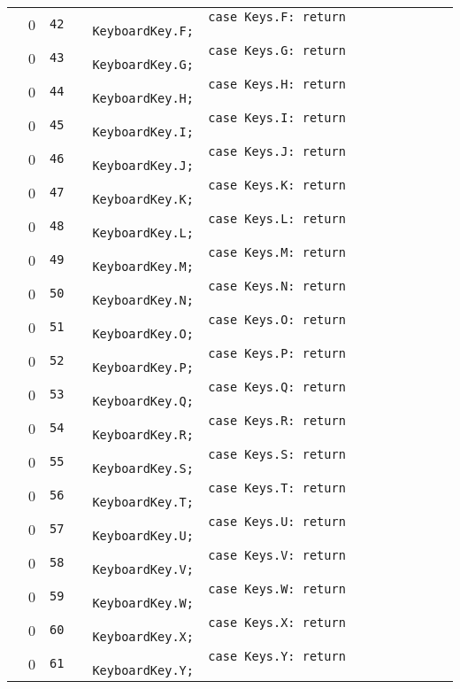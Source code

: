 \documentclass[a4paper,landscape,10pt]{article}
\begin{document}
\begin{longtable}[l]{lrrll}
\cellcolor{red} & 0 & \verb~42~ & & \verb~                case Keys.F: return KeyboardKey.F;~\\
\cellcolor{red} & 0 & \verb~43~ & & \verb~                case Keys.G: return KeyboardKey.G;~\\
\cellcolor{red} & 0 & \verb~44~ & & \verb~                case Keys.H: return KeyboardKey.H;~\\
\cellcolor{red} & 0 & \verb~45~ & & \verb~                case Keys.I: return KeyboardKey.I;~\\
\cellcolor{red} & 0 & \verb~46~ & & \verb~                case Keys.J: return KeyboardKey.J;~\\
\cellcolor{red} & 0 & \verb~47~ & & \verb~                case Keys.K: return KeyboardKey.K;~\\
\cellcolor{red} & 0 & \verb~48~ & & \verb~                case Keys.L: return KeyboardKey.L;~\\
\cellcolor{red} & 0 & \verb~49~ & & \verb~                case Keys.M: return KeyboardKey.M;~\\
\cellcolor{red} & 0 & \verb~50~ & & \verb~                case Keys.N: return KeyboardKey.N;~\\
\cellcolor{red} & 0 & \verb~51~ & & \verb~                case Keys.O: return KeyboardKey.O;~\\
\cellcolor{red} & 0 & \verb~52~ & & \verb~                case Keys.P: return KeyboardKey.P;~\\
\cellcolor{red} & 0 & \verb~53~ & & \verb~                case Keys.Q: return KeyboardKey.Q;~\\
\cellcolor{red} & 0 & \verb~54~ & & \verb~                case Keys.R: return KeyboardKey.R;~\\
\cellcolor{red} & 0 & \verb~55~ & & \verb~                case Keys.S: return KeyboardKey.S;~\\
\cellcolor{red} & 0 & \verb~56~ & & \verb~                case Keys.T: return KeyboardKey.T;~\\
\cellcolor{red} & 0 & \verb~57~ & & \verb~                case Keys.U: return KeyboardKey.U;~\\
\cellcolor{red} & 0 & \verb~58~ & & \verb~                case Keys.V: return KeyboardKey.V;~\\
\cellcolor{red} & 0 & \verb~59~ & & \verb~                case Keys.W: return KeyboardKey.W;~\\
\cellcolor{red} & 0 & \verb~60~ & & \verb~                case Keys.X: return KeyboardKey.X;~\\
\cellcolor{red} & 0 & \verb~61~ & & \verb~                case Keys.Y: return KeyboardKey.Y;~\\

\end{longtable}
\end{document}
